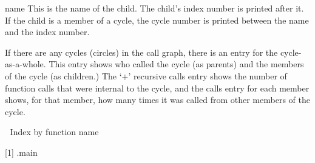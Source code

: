      name	This is the name of the child.  The child's index
		number is printed after it.  If the child is a
		member of a cycle, the cycle number is printed
		between the name and the index number.

 If there are any cycles (circles) in the call graph, there is an
 entry for the cycle-as-a-whole.  This entry shows who called the
 cycle (as parents) and the members of the cycle (as children.)
 The `+' recursive calls entry shows the number of function calls that
 were internal to the cycle, and the calls entry for each member shows,
 for that member, how many times it was called from other members of
 the cycle.


Index by function name

   [1] .main
